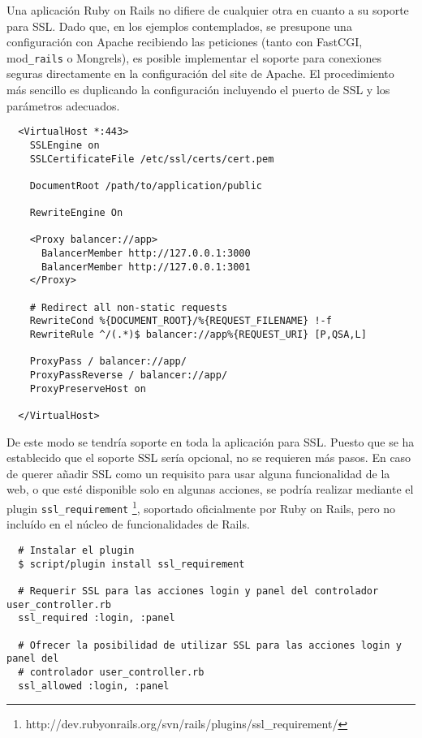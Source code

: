 Una aplicación Ruby on Rails no difiere de cualquier otra en cuanto a su soporte para SSL. Dado que, en los ejemplos contemplados, se presupone una configuración con Apache recibiendo las peticiones (tanto con FastCGI, mod\texttt{\_rails} o Mongrels), es posible implementar el soporte para conexiones seguras directamente en la configuración del site de Apache. El procedimiento más sencillo es duplicando la configuración incluyendo el puerto de SSL y los parámetros adecuados.

\begin{verbatim}
  <VirtualHost *:443>
    SSLEngine on
    SSLCertificateFile /etc/ssl/certs/cert.pem

    DocumentRoot /path/to/application/public

    RewriteEngine On

    <Proxy balancer://app>
      BalancerMember http://127.0.0.1:3000
      BalancerMember http://127.0.0.1:3001
    </Proxy>
    
    # Redirect all non-static requests
    RewriteCond %{DOCUMENT_ROOT}/%{REQUEST_FILENAME} !-f
    RewriteRule ^/(.*)$ balancer://app%{REQUEST_URI} [P,QSA,L]

    ProxyPass / balancer://app/
    ProxyPassReverse / balancer://app/
    ProxyPreserveHost on

  </VirtualHost>
\end{verbatim}

De este modo se tendría soporte en toda la aplicación para SSL. Puesto que se ha establecido que el soporte SSL sería opcional, no se requieren más pasos. En caso de querer añadir SSL como un requisito para usar alguna funcionalidad de la web, o que esté disponible solo en algunas acciones, se podría realizar mediante el plugin \texttt{ssl_requirement} \footnote{http://dev.rubyonrails.org/svn/rails/plugins/ssl_requirement/}, soportado oficialmente por Ruby on Rails, pero no incluído en el núcleo de funcionalidades de Rails.

\begin{verbatim}
  # Instalar el plugin
  $ script/plugin install ssl_requirement
  
  # Requerir SSL para las acciones login y panel del controlador user_controller.rb
  ssl_required :login, :panel
  
  # Ofrecer la posibilidad de utilizar SSL para las acciones login y panel del
  # controlador user_controller.rb
  ssl_allowed :login, :panel
\end{verbatim}


